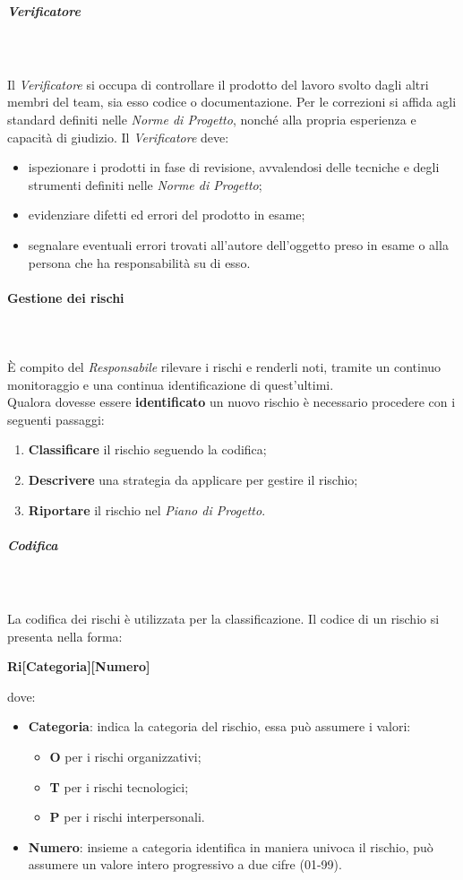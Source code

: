 \subparagraph*{Verificatore}\mbox{} \\ \mbox{} \\
Il \textit{Verificatore} si occupa di controllare il prodotto del lavoro svolto dagli altri membri del team, sia esso codice o documentazione. Per le correzioni si affida agli standard definiti nelle \textit{Norme di Progetto}, nonché alla propria esperienza e capacità di giudizio.
Il \textit{Verificatore} deve:
\begin{itemize}
	\item ispezionare i prodotti in fase di revisione, avvalendosi delle tecniche e degli strumenti definiti nelle \textit{Norme di Progetto};
	\item evidenziare difetti ed errori del prodotto in esame;
	\item segnalare eventuali errori trovati all'autore dell'oggetto preso in esame o alla persona che ha responsabilità su di esso.
\end{itemize}

\paragraph{Gestione dei rischi}\mbox{} \\ \mbox{} \\
È compito del \textit{Responsabile} rilevare i rischi e renderli noti, tramite un continuo monitoraggio e una continua identificazione di quest'ultimi. \\
Qualora dovesse essere \textbf{identificato} un nuovo rischio è necessario procedere con i seguenti passaggi:
\begin{enumerate}
	\item \textbf{Classificare} il rischio seguendo la codifica;
	\item \textbf{Descrivere} una strategia da applicare per gestire il rischio;
	\item \textbf{Riportare} il rischio nel \textit{Piano di Progetto}.
\end{enumerate}

\subparagraph{Codifica}\mbox{} \\ \mbox{} \\
La codifica dei rischi è utilizzata per la classificazione. Il codice di un rischio si presenta nella forma: \\
\centerline{\textbf{Ri[Categoria][Numero]}}
dove:
\begin{itemize}
	\item \textbf{Categoria}: indica la categoria del rischio, essa può assumere i valori:
	\begin{itemize}
		\item \textbf{O} per i rischi organizzativi;
		\item \textbf{T} per i rischi tecnologici;
		\item \textbf{P} per i rischi interpersonali.
	\end{itemize}
	\item \textbf{Numero}: insieme a categoria identifica in maniera univoca il rischio, può assumere un valore intero progressivo a due cifre (01-99).
\end{itemize}

